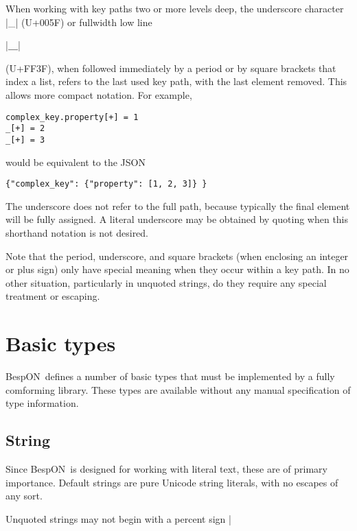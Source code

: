 \documentclass[11pt]{article}
\newcommand{\bespon}{BespON}
\begin{document}
When working with key paths two or more levels deep, the underscore character |_| (U+005F) or fullwidth low line \begin{CJK*}{UTF8}{gkai}|＿|\end{CJK*} (U+FF3F), when followed immediately by a period or by square brackets that index a list, refers to the last used key path, with the last element removed.  This allows more compact notation.  For example,
\begin{Verbatim}
complex_key.property[+] = 1
_[+] = 2
_[+] = 3
\end{Verbatim}
would be equivalent to the JSON
\begin{Verbatim}
{"complex_key": {"property": [1, 2, 3]} }
\end{Verbatim}
The underscore does not refer to the full path, because typically the final element will be fully assigned.  A literal underscore may be obtained by quoting when this shorthand notation is not desired.

Note that the period, underscore, and square brackets (when enclosing an integer or plus sign) only have special meaning when they occur within a key path.  In no other situation, particularly in unquoted strings, do they require any special treatment or escaping.



\section{Basic types}

\bespon\ defines a number of basic types that must be implemented by a fully comforming library.  These types are available without any manual specification of type information.

\subsection{String}

Since \bespon\ is designed for working with literal text, these are of primary importance.  Default strings are pure Unicode string literals, with no escapes of any sort.

Unquoted strings may not begin with a percent sign |%
\end{document}
